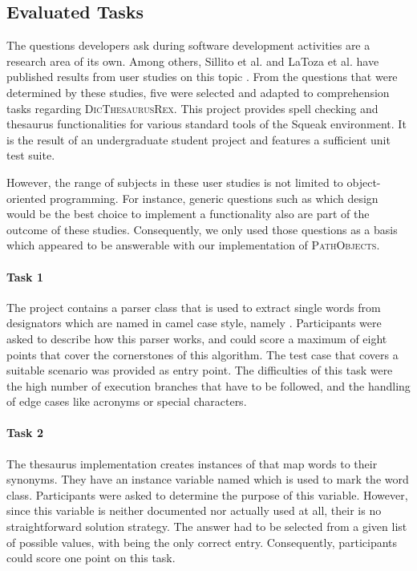 \subsection{Evaluated Tasks}
The questions developers ask during software development activities are a research area of its own.
Among others, Sillito et al. and LaToza et al. have published results from user studies on this topic \cite{sillito_asking_2008, latoza_hard--answer_2010}.
From the questions that were determined by these studies, five were selected and adapted to comprehension tasks regarding \textsc{DicThesaurusRex}.
This project provides spell checking and thesaurus functionalities for various standard tools of the Squeak environment.
It is the result of an undergraduate student project and features a sufficient unit test suite.

However, the range of subjects in these user studies is not limited to object-oriented programming.
For instance, generic questions such as which design would be the best choice to implement a functionality also are part of the outcome of these studies.
Consequently, we only used those questions as a basis which appeared to be answerable with our implementation of \textsc{PathObjects}.

\paragraph{Task 1} The project contains a parser class that is used to extract single words from designators which are named in camel case style, namely .
Participants were asked to describe how this parser works, and could score a maximum of eight points that cover the cornerstones of this algorithm.
The test case  that covers a suitable scenario was provided as entry point.
The difficulties of this task were the high number of execution branches that have to be followed, and the handling of edge cases like acronyms or special characters.

\paragraph{Task 2} The thesaurus implementation creates instances of  that map words to their synonyms.
They have an instance variable named  which is used to mark the word class.
Participants were asked to determine the purpose of this variable.
However, since this variable is neither documented nor actually used at all, their is no straightforward solution strategy.
The answer had to be selected from a given list of possible values, with  being the only correct entry.
Consequently, participants could score one point on this task.

